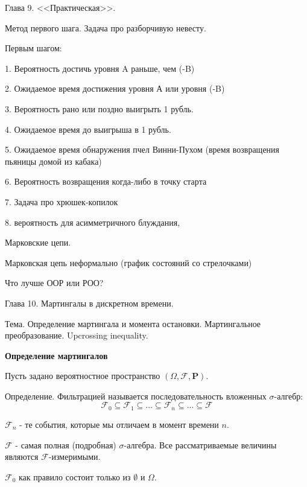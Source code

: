{Глава 9. <<Практическая>>.  \par
Метод первого шага. Задача про разборчивую невесту. \par
Первым шагом: \par
1. Вероятность достичь уровня A раньше, чем (-B) \par
2. Ожидаемое время достижения уровня А или уровня (-B) \par
3. Вероятность рано или поздно выигрыть 1 рубль. \par
4. Ожидаемое время до выигрыша в 1 рубль. \par
5. Ожидаемое время обнаружения пчел Винни-Пухом (время возвращения
пьяницы домой из кабака) \par
6. Вероятность возвращения когда-либо в точку старта \par
7. Задача про хрюшек-копилок \par
8. вероятность для асимметричного блуждания, \par

Марковские цепи. \par
Марковская цепь неформально (график состояний со стрелочками) \par
Что лучше ООР или РОО? \par



Глава 10. Мартингалы в дискретном времени. \par

Тема. Определение мартингала и момента остановки. Мартингальное
преобразование. Upcrossing inequality. \par

\textbf{Определение мартингалов}

Пусть задано вероятностное пространство
$(\Omega,\mathcal{F},\mathbf{P})$.

Определение. Фильтрацией называется последовательность вложенных
$\sigma$-алгебр:
$$
\mathcal{F}_{0} \subseteq \mathcal{ F }_{1} \subseteq ...
\subseteq \mathcal{F}_{n} \subseteq ... \subseteq\mathcal{F}
$$

$\mathcal{F}_{n}$ - те события, которые мы отличаем в момент
времени $n$. \par
$\mathcal{F}$ - самая полная (подробная) $\sigma$-алгебра. Все
рассматриваемые величины являются $\mathcal{F}$-измеримыми. \par
$\mathcal{F}_{0}$ как правило состоит только из $\emptyset$ и
$\Omega$. \par

}

